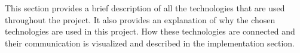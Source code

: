 This section provides a brief description of all the technologies that are used throughout the project. It also provides an explanation of why the chosen technologies are used in this project. How these technologies are connected and their communication is visualized and described in the implementation section.